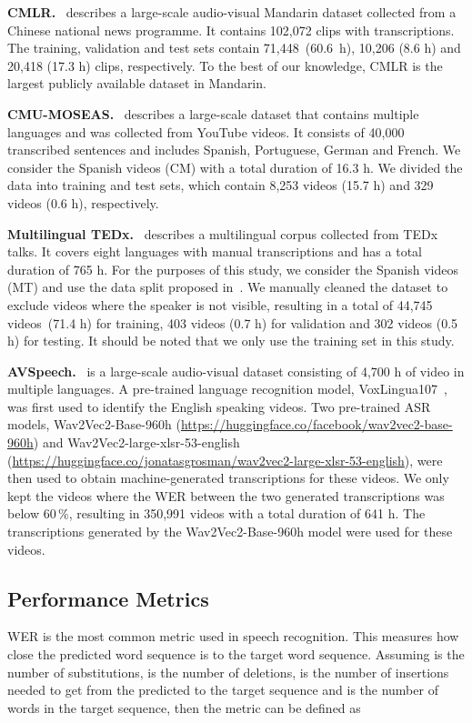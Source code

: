 \documentclass[twocolumn]{article}
\begin{document}
\noindent\textbf{CMLR.}~\cite{zhao2019cascade} describes a large-scale audio-visual Mandarin dataset collected from a Chinese national news programme. It contains 102,072 clips with transcriptions. The training, validation and test sets contain 71,448~(60.6~h), 10,206 (8.6 h) and 20,418 (17.3 h) clips, respectively. To the best of our knowledge, CMLR is the largest publicly available dataset in Mandarin.

\noindent\textbf{CMU-MOSEAS.}~\cite{bagher-zadeh-etal-2020-cmu} describes a large-scale dataset that contains multiple languages and was collected from YouTube videos. It consists of 40,000 transcribed sentences and includes Spanish, Portuguese, German and French. We consider the Spanish videos (CM) with a total duration of 16.3 h. We divided the data into training and test sets, which contain 8,253 videos (15.7 h) and 329 videos (0.6 h), respectively.

\noindent\textbf{Multilingual TEDx.}~\cite{salesky21_interspeech} describes a multilingual corpus collected from TEDx talks. It covers eight languages with manual transcriptions and has a total duration of 765 h. For the purposes of this study, we consider the Spanish videos (MT) and use the data split proposed in~\cite{salesky21_interspeech}. We manually cleaned the dataset to exclude videos where the speaker is not visible, resulting in a total of 44,745 videos~(71.4 h) for training, 403 videos (0.7 h) for validation and 302 videos (0.5 h) for testing. It should be noted that we only use the training set in this study.

\noindent\textbf{AVSpeech.}~\cite{DBLP:journals/tog/EphratMLDWHFR18} is a large-scale audio-visual dataset consisting of 4,700 h of video in multiple languages. A pre-trained language recognition model, VoxLingua107~\cite{valk2021slt}, was first used to identify the English speaking videos. Two pre-trained ASR models, Wav2Vec2-Base-960h (\url{https://huggingface.co/facebook/wav2vec2-base-960h}) and Wav2Vec2-large-xlsr-53-english (\url{https://huggingface.co/jonatasgrosman/wav2vec2-large-xlsr-53-english}), were then used to obtain machine-generated transcriptions for these videos. We only kept the videos where the WER between the two generated transcriptions was below 60\,\%, resulting in 350,991 videos with a total duration of 641 h. The transcriptions generated by the Wav2Vec2-Base-960h model were used for these videos.

\subsection{Performance Metrics}
WER is the most common metric used in speech recognition. This measures how close the predicted word sequence is to the target word sequence. Assuming  is the number of substitutions,  is the number of deletions,  is the number of insertions needed to get from the predicted to the target sequence and  is the number of words in the target sequence, then the metric can be defined as
\end{document}
